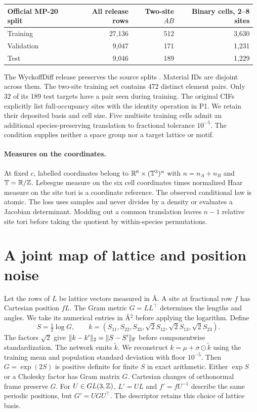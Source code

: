 \begin{center}\small
\begin{tabular}{lrrr}
\hline
Official MP-20 split & All release rows & Two-site $AB$ & Binary cells, 2--8 sites\\\hline
Training & 27,136 & 512 & 3,630\\
Validation & 9,047 & 171 & 1,231\\
Test & 9,046 & 189 & 1,229\\\hline
\end{tabular}
\end{center}
The WyckoffDiff release preserves the source splits \cite{wyckoff}. Material IDs are disjoint across them. The two-site training set contains 472 distinct element pairs. Only 32 of its 189 test targets have a pair seen during training. The original CIFs explicitly list full-occupancy sites with the identity operation in P1. We retain their deposited basis and cell size. Five multisite training cells admit an additional species-preserving translation to fractional tolerance $10^{-5}$. The condition supplies neither a space group nor a target lattice or motif.

\paragraph{Measures on the coordinates.}
At fixed $c$, labelled coordinates belong to $\mathbb R^6\times(\mathbb T^3)^n$ with $n=n_A+n_B$ and $\mathbb T=\mathbb R/\mathbb Z$. Lebesgue measure on the six cell coordinates times normalized Haar measure on the site tori is a coordinate reference. The observed conditional law is atomic. The loss uses samples and never divides by a density or evaluates a Jacobian determinant. Modding out a common translation leaves $n-1$ relative site tori before taking the quotient by within-species permutations.

\newpage
\section{A joint map of lattice and position noise}
Let the rows of $L$ be lattice vectors measured in \AA. A site at fractional row $f$ has Cartesian position $fL$. The Gram metric $G=LL^\top$ determines the lengths and angles. We take its numerical entries in \AA$^2$ before applying the logarithm. Define
\begin{equation}
 S=\tfrac12\log G,\qquad k=(S_{11},S_{22},S_{33},\sqrt2 S_{12},\sqrt2 S_{13},\sqrt2 S_{23}).
 \label{s:cell}
\end{equation}
The factors $\sqrt2$ give $\|k-k'\|_2=\|S-S'\|_{\rm F}$ before componentwise standardization. The network emits $\tilde k$. We reconstruct $k=\mu+\sigma\odot\tilde k$ using the training mean and population standard deviation with floor $10^{-5}$. Then $G=\exp(2S)$ is positive definite for finite $S$ in exact arithmetic. Either $\exp S$ or a Cholesky factor has Gram matrix $G$. Cartesian changes of orthonormal frame preserve $G$. For $U\in GL(3,\mathbb Z)$, $L'=UL$ and $f'=fU^{-1}$ describe the same periodic positions, but $G'=UGU^\top$. The descriptor retains this choice of lattice basis.

